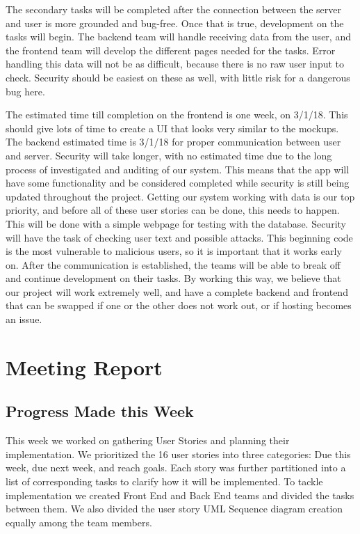 \documentclass[12pt]{article}
\begin{document}
The secondary tasks will be completed after the connection between the server
and user is more grounded and bug-free. Once that is true, development on the
tasks will begin. The backend team will handle receiving data from the user, and
the frontend team will develop the different pages needed for the tasks. Error
handling this data will not be as difficult, because there is no raw user input
to check. Security should be easiest on these as well, with little risk for a
dangerous bug here.

The estimated time till completion on the frontend is one week, on 3/1/18. This
should give lots of time to create a UI that looks very similar to the mockups.
The backend estimated time is 3/1/18 for proper communication between user and
server. Security will take longer, with no estimated time due to the long
process of investigated and auditing of our system. This means that the app will
have some functionality and be considered completed while security is still
being updated throughout the project. Getting our system working with data is
our top priority, and before all of these user stories can be done, this needs
to happen. This will be done with a simple webpage for testing with the
database. Security will have the task of checking user text and possible
attacks. This beginning code is the most vulnerable to malicious users, so it is
important that it works early on. After the communication is established, the
teams will be able to break off and continue development on their tasks. By
working this way, we believe that our project will work extremely well, and have
a complete backend and frontend that can be swapped if one or the other does not
work out, or if hosting becomes an issue.

\section{Meeting Report}

\subsection{Progress Made this Week}

This week we worked on gathering User Stories and planning their implementation.
We prioritized the 16 user stories into three categories: Due this week, due
next week, and reach goals. Each story was further partitioned into a list of
corresponding tasks to clarify how it will be implemented. To tackle
implementation we created Front End and Back End teams and divided the tasks
between them. We also divided the user story UML Sequence diagram creation
equally among the team members.
\end{document}
